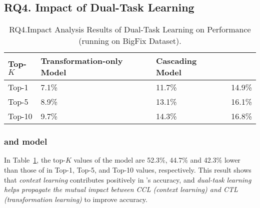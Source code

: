 \subsection{\bf RQ4. Impact of Dual-Task Learning}
\label{rq4:sec}


\begin{table}[t]
  \caption{RQ4.Impact Analysis Results of Dual-Task Learning on Performance (running on BigFix Dataset).}
  \vspace{-6pt}
	{\small
	  \begin{center}
            \tabcolsep 3pt
			\renewcommand{\arraystretch}{1}
			\begin{tabular}{p{1cm}<{\centering}|p{3.2cm}<{\centering}|p{2cm}<{\centering}|p{1cm}<{\centering}}
				\hline
				Top-$K$ & Transformation-only Model & Cascading Model &  \tool \\			
				\hline
				Top-1   & 7.1\% & 11.7\% & 14.9\% \\ \hline
				Top-5	& 8.9\% & 13.1\% & 16.1\% \\ \hline
				Top-10	& 9.7\% & 14.3\% & 16.8\%\\ \hline
			
				\hline
			\end{tabular}
			\label{fig:rq4_results}
		\end{center}
	}
\end{table}




\subsubsection{{\bf {\tool} and 
  model}}

In Table~\ref{fig:rq4_results}, the top-$K$ values
of the  model are 52.3\%, 44.7\% and 42.3\%
lower than those of {\tool} in Top-1, Top-5, and Top-10 values,
respectively. This result shows that {\em context learning}
contributes positively in {\tool}'s accuracy, and {\em dual-task
  learning helps propagate the mutual impact between CCL (context
  learning) and CTL (transformation learning)} to improve accuracy.



